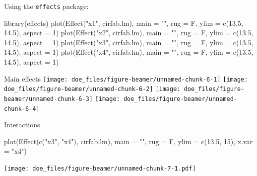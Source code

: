\documentclass[
  ignorenonframetext,
]{beamer}
\newenvironment{Shaded}{\begin{snugshade}}{\end{snugshade}}
\newcommand{\AttributeTok}[1]{\textcolor[rgb]{0.77,0.63,0.00}{#1}}
\newcommand{\DecValTok}[1]{\textcolor[rgb]{0.00,0.00,0.81}{#1}}
\newcommand{\FloatTok}[1]{\textcolor[rgb]{0.00,0.00,0.81}{#1}}
\newcommand{\FunctionTok}[1]{\textcolor[rgb]{0.00,0.00,0.00}{#1}}
\newcommand{\NormalTok}[1]{#1}
\newcommand{\StringTok}[1]{\textcolor[rgb]{0.31,0.60,0.02}{#1}}
\begin{document}
\begin{frame}[fragile]{}
\protect\hypertarget{section-7}{}
Using the \texttt{effects} package:

\begin{Shaded}
\begin{Highlighting}[]
\FunctionTok{library}\NormalTok{(effects)}
\FunctionTok{plot}\NormalTok{(}\FunctionTok{Effect}\NormalTok{(}\StringTok{"x1"}\NormalTok{, cirfab.lm), }\AttributeTok{main =} \StringTok{""}\NormalTok{, }\AttributeTok{rug =}\NormalTok{ F, }\AttributeTok{ylim =} \FunctionTok{c}\NormalTok{(}\FloatTok{13.5}\NormalTok{, }\FloatTok{14.5}\NormalTok{), }\AttributeTok{aspect =} \DecValTok{1}\NormalTok{)}
\FunctionTok{plot}\NormalTok{(}\FunctionTok{Effect}\NormalTok{(}\StringTok{"x2"}\NormalTok{, cirfab.lm), }\AttributeTok{main =} \StringTok{""}\NormalTok{, }\AttributeTok{rug =}\NormalTok{ F, }\AttributeTok{ylim =} \FunctionTok{c}\NormalTok{(}\FloatTok{13.5}\NormalTok{, }\FloatTok{14.5}\NormalTok{), }\AttributeTok{aspect =} \DecValTok{1}\NormalTok{)}
\FunctionTok{plot}\NormalTok{(}\FunctionTok{Effect}\NormalTok{(}\StringTok{"x3"}\NormalTok{, cirfab.lm), }\AttributeTok{main =} \StringTok{""}\NormalTok{, }\AttributeTok{rug =}\NormalTok{ F, }\AttributeTok{ylim =} \FunctionTok{c}\NormalTok{(}\FloatTok{13.5}\NormalTok{, }\FloatTok{14.5}\NormalTok{), }\AttributeTok{aspect =} \DecValTok{1}\NormalTok{)}
\FunctionTok{plot}\NormalTok{(}\FunctionTok{Effect}\NormalTok{(}\StringTok{"x4"}\NormalTok{, cirfab.lm), }\AttributeTok{main =} \StringTok{""}\NormalTok{, }\AttributeTok{rug =}\NormalTok{ F, }\AttributeTok{ylim =} \FunctionTok{c}\NormalTok{(}\FloatTok{13.5}\NormalTok{, }\FloatTok{14.5}\NormalTok{), }\AttributeTok{aspect =} \DecValTok{1}\NormalTok{)}
\end{Highlighting}
\end{Shaded}
\end{frame}

\begin{frame}{Main effects}
\protect\hypertarget{main-effects}{}
\texttt{[image: doe\_files/figure-beamer/unnamed-chunk-6-1]}
\texttt{[image: doe\_files/figure-beamer/unnamed-chunk-6-2]}
\texttt{[image: doe\_files/figure-beamer/unnamed-chunk-6-3]}
\texttt{[image: doe\_files/figure-beamer/unnamed-chunk-6-4]}
\end{frame}

\begin{frame}[fragile]{Interactions}
\protect\hypertarget{interactions}{}
\begin{Shaded}
\begin{Highlighting}[]
\FunctionTok{plot}\NormalTok{(}\FunctionTok{Effect}\NormalTok{(}\FunctionTok{c}\NormalTok{(}\StringTok{"x3"}\NormalTok{, }\StringTok{"x4"}\NormalTok{), cirfab.lm), }\AttributeTok{main =} \StringTok{""}\NormalTok{, }\AttributeTok{rug =}\NormalTok{ F, }\AttributeTok{ylim =} \FunctionTok{c}\NormalTok{(}\FloatTok{13.5}\NormalTok{, }\DecValTok{15}\NormalTok{), }
     \AttributeTok{x.var =} \StringTok{"x4"}\NormalTok{)}
\end{Highlighting}
\end{Shaded}

\texttt{[image: doe\_files/figure-beamer/unnamed-chunk-7-1.pdf]}
\end{frame}
\end{document}
